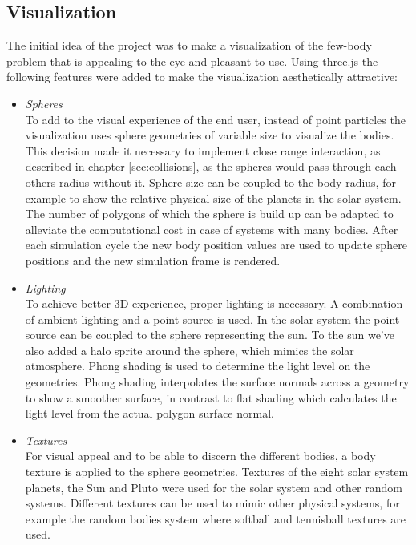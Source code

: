\documentclass[a4paper]{article}
\begin{document}
\subsection{Visualization}
The initial idea of the project was to make a visualization of the few-body problem that is
appealing to the eye and pleasant to use. Using three.js the following features were added to make
the visualization aesthetically attractive:
\begin{itemize}
\item \emph{Spheres}\\
  To add to the visual experience of the end user, instead of point particles the visualization uses
  sphere geometries of variable size to visualize the bodies. This decision made it necessary to
  implement close range interaction, as described in chapter \ref{sec:collisions}, as the spheres
  would pass through each others radius without it. Sphere size can be coupled to the body radius,
  for example to show the relative physical size of the planets in the solar system. The number of
  polygons of which the sphere is build up can be adapted to alleviate the computational cost in
  case of systems with many bodies. After each simulation cycle the new body position values are
  used to update sphere positions and the new simulation frame is rendered.

\item \emph{Lighting}\\
  To achieve better 3D experience, proper lighting is necessary. A combination of ambient lighting
  and a point source is used. In the solar system the point source can be coupled to the sphere
  representing the sun. To the sun we've also added a halo sprite around the sphere, which mimics
  the solar atmosphere. Phong shading is used to determine the light level on the geometries. Phong
  shading interpolates the surface normals across a geometry to show a smoother surface, in contrast
  to flat shading which calculates the light level from the actual polygon surface normal.


\item \emph{Textures}\\
  For visual appeal and to be able to discern the different bodies, a body texture is applied to the
  sphere geometries. Textures of the eight solar system planets, the Sun and Pluto were used for the
  solar system and other random systems. \cite{planettexture} Different textures can be used to
  mimic other physical systems, for example the random bodies system where softball and tennisball
  textures are used. \cite{balltexture}


\end{itemize}
\end{document}
